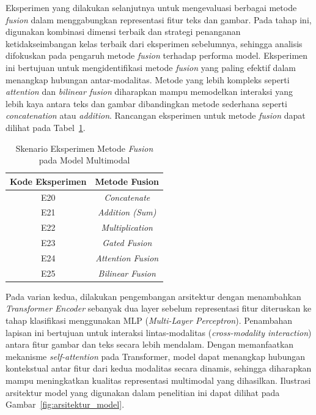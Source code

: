 Eksperimen yang dilakukan selanjutnya untuk mengevaluasi berbagai metode \textit{fusion} dalam menggabungkan representasi fitur teks dan gambar. Pada tahap ini, digunakan kombinasi dimensi terbaik dan strategi penanganan ketidakseimbangan kelas terbaik dari eksperimen sebelumnya, sehingga analisis difokuskan pada pengaruh metode \textit{fusion} terhadap performa model. Eksperimen ini bertujuan untuk mengidentifikasi metode \textit{fusion} yang paling efektif dalam menangkap hubungan antar-modalitas. Metode yang lebih kompleks seperti \textit{attention} dan \textit{bilinear fusion} diharapkan mampu memodelkan interaksi yang lebih kaya antara teks dan gambar dibandingkan metode sederhana seperti \textit{concatenation} atau \textit{addition}. Rancangan eksperimen untuk metode \textit{fusion} dapat dilihat pada Tabel~\ref{tabel:metode_fusion_multimodal}.
\begin{table}[H]
    \centering
    \caption{Skenario Eksperimen Metode \textit{Fusion} pada Model Multimodal}
    \label{tabel:metode_fusion_multimodal}
    \small
    \setlength{\tabcolsep}{8pt}
    \renewcommand{\arraystretch}{1.1}
    \begin{tabular}{c c}
        \hline
        \textbf{Kode Eksperimen} & \textbf{Metode Fusion} \\
        \hline
        E20 & \textit{Concatenate} \\
        E21 & \textit{Addition (Sum)} \\
        E22 & \textit{Multiplication} \\
        E23 & \textit{Gated Fusion} \\
        E24 & \textit{Attention Fusion} \\
        E25 & \textit{Bilinear Fusion} \\
        \hline
    \end{tabular}
\end{table}

Pada varian kedua, dilakukan pengembangan arsitektur dengan menambahkan \textit{Transformer Encoder} sebanyak dua layer sebelum representasi fitur diteruskan ke tahap klasifikasi menggunakan MLP (\textit{Multi-Layer Perceptron}). Penambahan lapisan ini bertujuan untuk interaksi lintas-modalitas (\textit{cross-modality interaction}) antara fitur gambar dan teks secara lebih mendalam. Dengan memanfaatkan mekanisme \textit{self-attention} pada Transformer, model dapat menangkap hubungan kontekstual antar fitur dari kedua modalitas secara dinamis, sehingga diharapkan mampu meningkatkan kualitas representasi multimodal yang dihasilkan. Ilustrasi arsitektur model yang digunakan dalam penelitian ini dapat dilihat pada Gambar~\ref{fig:arsitektur_model}.

